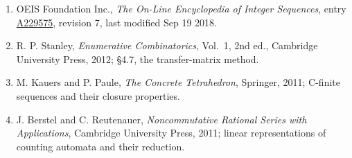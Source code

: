 \documentclass[11pt]{article}
\theoremstyle{definition}
\begin{document}
\begin{enumerate}

\item OEIS Foundation Inc., \emph{The On-Line Encyclopedia of Integer Sequences}, entry \href{https://oeis.org/A229575}{A229575}, revision 7, last modified Sep 19 2018.

\item R. P. Stanley, \emph{Enumerative Combinatorics}, Vol.~1, 2nd ed., Cambridge University Press, 2012; \S4.7, the transfer-matrix method.

\item M. Kauers and P. Paule, \emph{The Concrete Tetrahedron}, Springer, 2011; C-finite sequences and their closure properties.

\item J. Berstel and C. Reutenauer, \emph{Noncommutative Rational Series with Applications}, Cambridge University Press, 2011; linear representations of counting automata and their reduction.

\end{enumerate}
\end{document}
